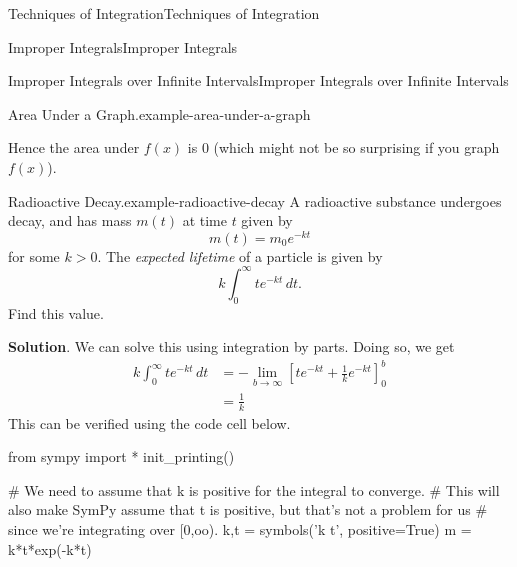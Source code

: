 \documentclass[10pt,]{book}
\numberwithin{equation}{section}
\newcommand{\gt}{>}
\begin{document}
\begin{chapterptx}{Techniques of Integration}{}{Techniques of Integration}{}{}
\begin{sectionptx}{Improper Integrals}{}{Improper Integrals}{}{}
\begin{subsectionptx}{Improper Integrals over Infinite Intervals}{}{Improper Integrals over Infinite Intervals}{}{}
\begin{example}{Area Under a Graph.}{example-area-under-a-graph}
%
\par
\hypertarget{p-591}{}%
Hence the area under \(f(x)\) is \(0\) (which might not be so surprising if you graph \(f(x)\)).%
\end{example}
\begin{example}{Radioactive Decay.}{example-radioactive-decay}%
\hypertarget{p-592}{}%
A radioactive substance undergoes decay, and has mass \(m(t)\) at time \(t\) given by%
\begin{equation*}
m(t) = m_{0}e^{-kt}
\end{equation*}
for some \(k\gt0\). The \emph{expected lifetime} of a particle is given by%
\begin{equation*}
k\int_{0}^{\infty}te^{-kt}\,dt.
\end{equation*}
Find this value.%
\par\smallskip%
\noindent\textbf{Solution}.\hypertarget{solution-128}{}\quad%
\hypertarget{p-593}{}%
We can solve this using integration by parts. Doing so, we get%
\begin{align*}
k\int_{0}^{\infty}te^{-kt}\,dt & = -\lim_{b\to\infty}\left[te^{-kt} + \frac{1}{k}e^{-kt}\right]_{0}^{b} \\
& = \frac{1}{k} 
\end{align*}
This can be verified using the code cell below.%
\end{example}
\begin{sageinput}
from sympy import *
init_printing()

# We need to assume that k is positive for the integral to converge.
# This will also make SymPy assume that t is positive, but that's not a problem for us
# since we're integrating over [0,oo).
k,t = symbols('k t', positive=True)
m = k*t*exp(-k*t)


\end{sageinput}
\end{subsectionptx}
\end{sectionptx}
\end{chapterptx}
\end{document}
